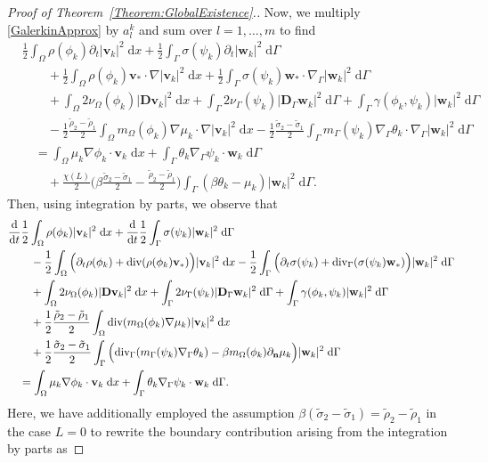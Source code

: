 \documentclass[10pt,reqno]{amsart}
\theoremstyle{remark}
\numberwithin{equation}{section}
\newcommand{\abs}[1]{| #1 |}
\newcommand{\n}{\mathbf{n}}
\newcommand{\bv}{\mathbf{v}}
\newcommand{\bw}{\mathbf{w}}
\newcommand{\D}{\mathbf{D}}
\newcommand{\Dg}{\mathbf{D}_\Gamma}
\newcommand{\intO}{\int_\Omega}
\newcommand{\intG}{\int_\Gamma}
\newcommand{\dx}{\;\mathrm{d}x}
\newcommand{\dG}{\;\mathrm d\Ga}
\newcommand{\ddt}{\frac{\mathrm d}{\mathrm dt}}
\newcommand{\delt}{\partial_{t}}
\newcommand{\deln}{\partial_\n}
\newcommand{\Grad}{\nabla}
\newcommand{\Div}{\textnormal{div}}
\newcommand{\Gradg}{\nabla_\Ga}
\newcommand{\Divg}{\textnormal{div}_\Ga}
\newcommand{\Om}{\Omega}
\newcommand{\Ga}{\Gamma}
\begin{document}
\begin{proof}[Proof of Theorem~\ref{Theorem:GlobalExistence}.]
Now, we multiply \eqref{GalerkinApprox} by $a_l^k$ and sum over $l=1,\ldots,m$ to find
\begin{align*}
    &\frac12\intO \rho(\phi_k)\delt\abs{\bv_k}^2\dx + \frac12\intG \sigma(\psi_k)\delt\abs{\bw_k}^2\dG \\
    &\qquad + \frac12\intO \rho(\phi_k)\bv_\ast\cdot\Grad\abs{\bv_k}^2\dx + \frac12\intG \sigma(\psi_k)\bw_\ast\cdot\Gradg\abs{\bw_k}^2\dG \\ 
    &\qquad + \intO 2\nu_\Om(\phi_k)\abs{\D\bv_k}^2\dx + \intG 2\nu_\Ga(\psi_k)\abs{\Dg\bw_k}^2\dG + \intG \gamma(\phi_k,\psi_k)\abs{\bw_k}^2\dG \\
    &\qquad - \frac12\frac{\tilde\rho_2 - \tilde\rho_1}{2}\intO m_\Om(\phi_k)\Grad\mu_k\cdot\Grad\abs{\bv_k}^2\dx - \frac12\frac{\tilde\sigma_2 - \tilde\sigma_1}{2}\intG m_\Ga(\psi_k)\Gradg\theta_k\cdot\Gradg\abs{\bw_k}^2\dG \\
    &\quad = \intO \mu_k\Grad\phi_k\cdot\bv_k\dx + \intG \theta_k\Gradg\psi_k\cdot\bw_k\dG \\
    &\qquad + \frac{\chi(L)}{2}\Big(\beta\frac{\tilde\sigma_2 - \tilde\sigma_1}{2} - \frac{\tilde\rho_2 - \tilde\rho_1}{2}\Big)\intG(\beta\theta_k - \mu_k)\abs{\bw_k}^2\dG. 
\end{align*}
Then, using integration by parts, we observe that
\begin{align*}
    &\ddt\frac12\intO \rho(\phi_k)\abs{\bv_k}^2\dx + \ddt\frac12\intG \sigma(\psi_k)\abs{\bw_k}^2\dG \nonumber \\
    &\qquad - \frac12\intO \Big(\delt\rho(\phi_k) + \Div(\rho(\phi_k)\bv_\ast)\Big)\abs{\bv_k}^2\dx - \frac12\intG \Big(\delt\sigma(\psi_k) + \Divg(\sigma(\psi_k)\bw_\ast)\Big)\abs{\bw_k}^2\dG \nonumber \\
    &\qquad + \intO 2\nu_\Om(\phi_k)\abs{\D\bv_k}^2\dx + \intG 2\nu_\Ga(\psi_k)\abs{\Dg\bw_k}^2\dG + \intG \gamma(\phi_k,\psi_k)\abs{\bw_k}^2\dG \\
    &\qquad + \frac12\frac{\tilde\rho_2 - \tilde\rho_1}{2}\intO
        \Div(m_\Om(\phi_k)\Grad\mu_k)\abs{\bv_k}^2\dx \nonumber \\
    &\qquad + \frac12\frac{\tilde\sigma_2 - \tilde\sigma_1}{2}\intG\Big(\Divg(m_\Ga(\psi_k)\Gradg\theta_k) - \beta m_\Om(\phi_k)\deln\mu_k\Big)\abs{\bw_k}^2\dG \nonumber \\
    &\quad = \intO \mu_k\Grad\phi_k\cdot\bv_k\dx + \intG \theta_k\Gradg\psi_k\cdot\bw_k\dG. \nonumber
\end{align*}
Here, we have additionally employed the assumption $\beta(\tilde\sigma_2 - \tilde\sigma_1) = \tilde\rho_2 - \tilde\rho_1$ in the case $L = 0$ to rewrite the boundary contribution arising from the integration by parts as

\end{proof}
\end{document}
